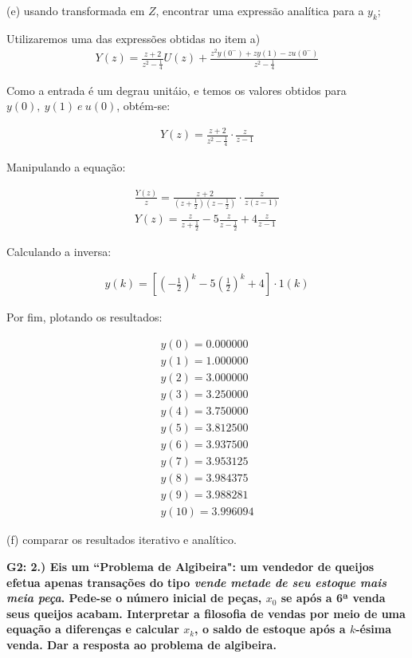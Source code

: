 \documentclass[10pt]{article}
\begin{document}
(e) usando transformada em $Z$, encontrar uma expressão analítica para a $y_k$;

Utilizaremos uma das expressões obtidas no item a)
\begin{align*}
    Y(z) = \frac{z + 2}{z^2 - \frac{1}{4}}U(z) + \frac{z^2y(0^-)+zy(1)-zu(0^-)}{z^2 - \frac{1}{4}}
\end{align*}

Como a entrada é um degrau unitáio, e temos os valores obtidos para $ y(0),\ y(1)\ e\ u(0) $, obtém-se:

\begin{align*}
    Y(z) = \frac{z + 2}{z^2 - \frac{1}{4}} \cdot \frac{z}{z-1}
\end{align*}

Manipulando a equação:

\begin{align*}
    \frac{Y(z)}{z} = \frac{z + 2}{(z+\frac{1}{2})(z-\frac{1}{2})} \cdot \frac{z}{z(z-1)}\\
    Y(z) = \frac{z}{z+\frac{1}{2}} - 5\frac{z}{z-\frac{1}{2}} + 4\frac{z}{z-1}
\end{align*}

Calculando a inversa:

\begin{align*}
    y(k) = \left[\left(-\frac{1}{2}\right)^k - 5\left(\frac{1}{2}\right)^k + 4\right] \cdot 1(k)
\end{align*}

Por fim, plotando os resultados:

\begin{align*}
    y(0) = 0.000000\\
    y(1) = 1.000000\\
    y(2) = 3.000000\\
    y(3) = 3.250000\\
    y(4) = 3.750000\\
    y(5) = 3.812500\\
    y(6) = 3.937500\\
    y(7) = 3.953125\\
    y(8) = 3.984375\\
    y(9) = 3.988281\\
    y(10)= 3.996094
\end{align*}

(f) comparar os resultados iterativo e analítico.


\vspace{\baselineskip}


\textbf{G2: 2.) Eis um ``Problema de Algibeira": um vendedor de queijos efetua apenas transações do tipo \emph{vende metade de seu estoque mais meia peça}. Pede-se o número inicial de peças, $x_0$ se após a 6ª venda seus queijos acabam. Interpretar a filosofia de vendas por meio de uma equação a diferenças e calcular $x_k$, o saldo de estoque após a $k$-ésima venda. Dar a resposta ao problema de algibeira.}
\end{document}
